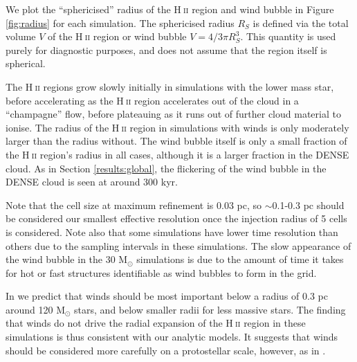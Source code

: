 \documentclass[a4paper,fleqn,usenatbib]{mnras}
\newcommand{\Msolar}{M$_{\odot}$\xspace}
\newcommand{\HII}{H$~$\textsc{ii}\xspace}
\begin{document}
We plot the ``sphericised'' radius of the \HII region and wind bubble in Figure \ref{fig:radius} for each simulation. The sphericised radius $R_S$ is defined via the total volume $V$ of the \HII region or wind bubble $V = 4/3 \pi R_S^3$. This quantity is used purely for diagnostic purposes, and does not assume that the region itself is spherical.

The \HII regions grow slowly initially in simulations with the lower mass star, before accelerating as the \HII region accelerates out of the cloud in a ``champagne'' flow, before plateauing as it runs out of further cloud material to ionise. The radius of the \HII region in simulations with winds is only moderately larger than the radius without. The wind bubble itself is only a small fraction of the \HII region's radius in all cases, although it is a larger fraction in the DENSE cloud. As in Section \ref{results:global}, the flickering of the wind bubble in the DENSE cloud is seen at around 300 kyr.

Note that the cell size at maximum refinement is 0.03 pc, so $\sim$0.1-0.3 pc should be considered our smallest effective resolution once the injection radius of 5 cells is considered. Note also that some simulations have lower time resolution than others due to the sampling intervals in these simulations. The slow appearance of the wind bubble in the 30 \Msolar simulations is due to the amount of time it takes for hot or fast structures identifiable as wind bubbles to form in the grid.

In \cite{Geen2019} we predict that winds should be most important below a radius of 0.3 pc around 120 \Msolar stars, and below smaller radii for less massive stars. The finding that winds do not drive the radial expansion of the \HII region in these simulations is thus consistent with our analytic models. It suggests that winds should be considered more carefully on a protostellar scale, however, as in \cite{Kuiper2018}.

\end{document}
